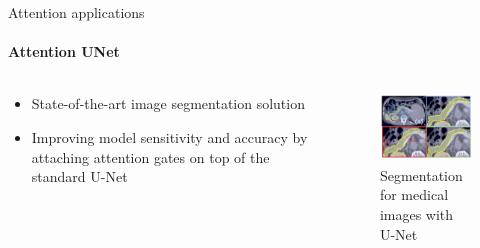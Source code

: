 \documentclass{beamer}
\begin{document}
\begin{frame}{Attention applications}
\framesubtitle{Attention UNet}

\begin{columns}
\begin{column}{0.4\textwidth}
    \begin{itemize}
    \item State-of-the-art image segmentation solution
    
    \item Improving model sensitivity and accuracy by attaching attention gates on top of the standard U-Net
    
    \end{itemize}   
\end{column}
\begin{column}{0.6\textwidth}  %
\begin{figure}
\includegraphics[width = .9\textwidth]{images/unet.png}
\caption{Segmentation for medical images with U-Net\cite{unet}}
\end{figure}{}
\end{column}
\end{columns}

    
\end{frame}
\end{document}
